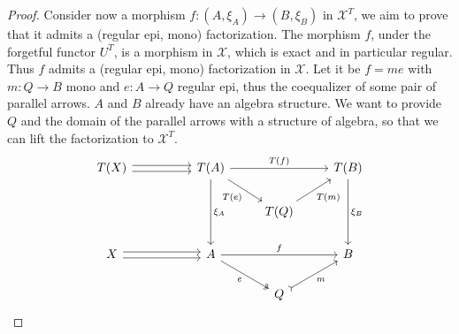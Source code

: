 \begin{subbox}{}
\begin{proof}
        Consider now a morphism $f:(A,\xi_A)\to (B, \xi_B)$ in $\mathcal{X}^T$, we aim to prove that it admits a (regular epi, mono) factorization. The morphism $f$, under the forgetful functor $U^T$, is a morphism in $\mathcal{X}$, which is exact and in particular regular. Thus $f$ admits a (regular epi, mono) factorization in $\mathcal{X}$. Let it be $f=me$ with $m:Q \to B$ mono and $e: A \to Q$ regular epi, thus the coequalizer of some pair of parallel arrows. $A$ and $B$ already have an algebra structure. We want to provide $Q$ and the domain of the parallel arrows with a structure of algebra, so that we can lift the factorization to $\mathcal{X}^T$.
        \[
\begin{tikzcd}
T(X) \arrow[rr, shift right] \arrow[rr, shift left] &  & T(A) \arrow[dd, "\xi_A"] \arrow[rr, "T(f)"] \arrow[rd, "T(e)"'] &                          & T(B) \arrow[dd, "\xi_B"] \\
                                                    &  &                                                                 & T(Q) \arrow[ru, "T(m)"'] &                          \\
X \arrow[rr, shift right] \arrow[rr, shift left]    &  & A \arrow[rd, "e"', two heads] \arrow[rr, "f"]                   &                          & B                        \\
                                                    &  &                                                                 & Q \arrow[ru, "m"', tail] &                         
\end{tikzcd}
        \]


\end{proof}
\end{subbox}

